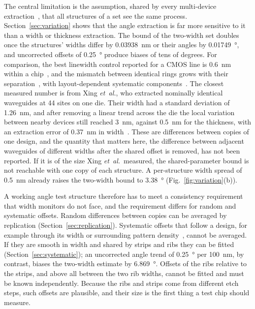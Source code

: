 The central limitation is the assumption, shared by every multi-device extraction~\cite{nrc2026}, that all
structures of a set see the same process. Section~\ref{sec:variation} shows that the angle extraction is far more
sensitive to it than a width or thickness extraction. The bound of the two-width set doubles once the structures'
widths differ by \qty{0.03938}{nm} or their angles by \qty{0.01749}{\degree}, and uncorrected offsets of
\qty{0.25}{\degree} produce biases of tens of degrees. For comparison, the best linewidth control reported for a
CMOS line is \qty{0.6}{nm} within a chip~\cite{selvaraja2010}, and the mismatch between identical rings grows with
their separation~\cite{chrostowski2014}, with layout-dependent systematic components~\cite{xing2023}. The closest
measured number is from Xing \textit{et~al.}, who extracted nominally identical waveguides at 44 sites on one die. Their width
had a standard deviation of \qty{1.26}{nm}, and after removing a linear trend across the die the local variation
between nearby devices still reached \qty{3}{nm}, against \qty{0.5}{nm} for the thickness, with an extraction error of
\qty{0.37}{nm} in width~\cite{xing2018}. These
are differences between copies of one design, and the quantity that matters here, the difference between adjacent
waveguides of different widths after the shared offset is removed, has not been reported. If it is of the size Xing
\textit{et~al.}\ measured, the shared-parameter bound is not reachable with one copy of each structure. A per-structure width spread of
\qty{0.5}{nm} already raises the two-width bound to \qty{3.38}{\degree} (Fig.~\ref{fig:variation}(b)).

A working angle test structure therefore has to meet a consistency requirement that width monitors do not face, and
the requirement differs for random and systematic offsets. Random differences between copies can be averaged by
replication (Section~\ref{sec:replication}). Systematic offsets that follow a design, for example through its width or
surrounding pattern density~\cite{xing2023}, cannot be averaged. If they are smooth in width and shared by strips and ribs
they can be fitted (Section~\ref{sec:systematic}); an uncorrected angle trend of \qty{0.25}{\degree} per \qty{100}{nm}, by contrast,
biases the two-width estimate by \qty{6.869}{\degree}. Offsets of the ribs relative to the strips, and above all between
the two rib widths, cannot be fitted and must be known independently. Because the ribs and strips come from different
etch steps, such offsets are plausible, and their size is the first thing a test chip should measure.

